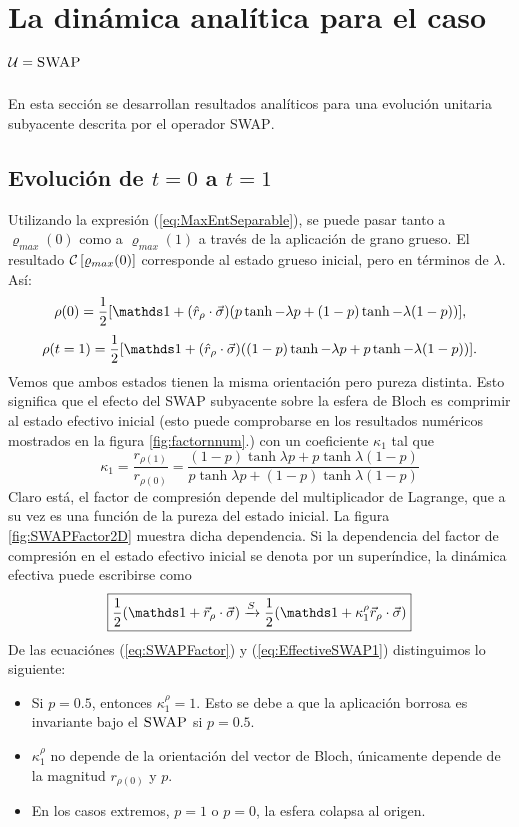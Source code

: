 \section{La dinámica analítica para el caso $\mathcal{U}=\textsc{SWAP}$}
En esta sección se desarrollan resultados analíticos para una evolución unitaria subyacente descrita por el operador \textsc{SWAP}.

\subsection{Evolución de $t=0$ a $t=1$}

Utilizando la expresión (\ref{eq:MaxEntSeparable}), se puede pasar tanto a $\varrho_{max}(0)$ como a $\varrho_{max}(1)$ a través de la aplicación de grano grueso. El resultado $\mathcal{C}\left[\varrho_{max}(0)\right]$ corresponde al estado grueso inicial, pero en términos de $\lambda$. Así:
\begin{equation}
\rho(0)=\frac{1}{2}[\Id+(\hat{r}_{\rho}\cdot\vec{\sigma})(p\tanh{-\lambda p}+(1-p)\tanh{-\lambda (1-p)})],
\end{equation}
\begin{equation}
\rho(t=1)=\frac{1}{2}[\Id+(\hat{r}_{\rho}\cdot\vec{\sigma})((1-p)\tanh{-\lambda p}+p\tanh{-\lambda (1-p)})].
\end{equation}
Vemos que ambos estados tienen la misma orientación pero pureza distinta. Esto significa que el efecto del \textsc{SWAP} subyacente sobre la esfera de Bloch es comprimir al estado efectivo inicial (esto puede comprobarse en los resultados numéricos mostrados en la figura \ref{fig:factornnum}.) con un coeficiente $\kappa_{1}$ tal que
\begin{equation}\label{eq:SWAPFactor}
  \kappa_{1}=\frac{r_{\rho(1)}}{r_{\rho(0)}}=\frac{(1-p)\tanh{\lambda p}+p\tanh{\lambda (1-p)}}{
    p\tanh{\lambda p}+(1-p)\tanh{\lambda (1-p)}}
\end{equation}
Claro está, el factor de compresión depende del multiplicador de Lagrange, que a su vez es una función de la pureza del estado inicial. La figura \ref{fig:SWAPFactor2D} muestra dicha dependencia. Si la dependencia del factor de compresión en el estado efectivo inicial se denota por un superíndice, la dinámica efectiva puede escribirse como
\begin{equation}\label{eq:EffectiveSWAP1}
  \boxed{\frac{1}{2}(\Id+\vec{r}_{\rho}\cdot\vec{\sigma}) \xrightarrow{S} \frac{1}{2}(\Id+\kappa_{1}^{\rho}\vec{r}_{\rho}\cdot\vec{\sigma})}
\end{equation}
De las ecuaciónes (\ref{eq:SWAPFactor}) y (\ref{eq:EffectiveSWAP1}) distinguimos lo siguiente:
\begin{itemize}
  \item Si $p=0.5$, entonces $\kappa_{1}^{\rho}=1$. Esto se debe a que la aplicación borrosa es invariante bajo el $\textsc{SWAP}$ si $p=0.5$.
  \item $\kappa_{1}^{\rho}$ no depende de la orientación del vector de Bloch, únicamente depende de la magnitud $r_{\rho(0)}$ y $p$.
  \item En los casos extremos, $p=1$ o $p=0$, la esfera colapsa al origen.
\end{itemize}

